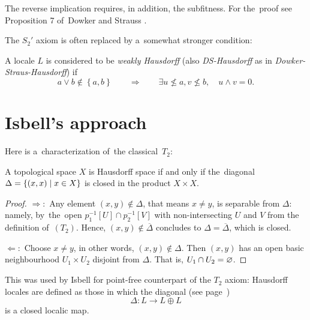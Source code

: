 \begin{rem}
  The reverse implication requires, in addition, the subfitness.
  For the~proof see Proposition 7 of~Dowker and Strauss
  \cite{ds72}.
\end{rem}

The $S_2'$ axiom is often replaced by a~somewhat stronger condition:

\begin{framed}
  \begin{df}[DS-Haus]
    A locale $L$ is considered to be \emph{weakly Hausdorff\/} (also
    \emph{DS-Hausdorff} as in \emph{Dowker-Straus-Hausdorff}) if
    \[
      a \vee b \not\in \left\{a, b\right\} \qquad \Rightarrow \qquad \exists
      u\not\leq a, v\not\leq b, \quad u \wedge v = 0.
    \]
  \end{df}
\end{framed}

\section{Isbell's approach}

Here is a~characterization of~the classical~$T_2$:

\begin{prop}
  A topological space $X$ is Hausdorff space if and only if the~diagonal
  $\Delta = \left\{(x, x) \mid x\in X \right\}$ is closed in the product
  $X\times X$.
\end{prop}

\begin{proof}
  $\Rightarrow:$ Any element $(x, y)\not\in \Delta$, that means $x \ne y$, is
  separable from $\Delta$:
  namely, by~the~open $p_1^{-1}[U] \cap p_2^{-1}[V]$ with non-intersecting $U$
  and $V$ from the definition of~$(T_2)$.
  Hence, $(x, y)\not\in \overline{\Delta}$ concludes to $\Delta =
  \overline{\Delta}$, which is closed.

  $\Leftarrow:$ Choose $x \ne y$, in other words, $(x, y)\not\in \Delta$.
  Then $(x, y)$ has an open basic neighbourhood $U_1\times U_2$ disjoint from
  $\Delta$.
  That is, $U_1 \cap U_2 = \varnothing$.
\end{proof}

This was used by Isbell \cite{isbell72} for point-free counterpart of the $T_2$
axiom:
Hausdorff locales are defined as those in which the diagonal (see
page~\pageref{codiag-in-Frm})
\[
  \Delta\colon L \to L \oplus L
\]
is a closed localic map.

